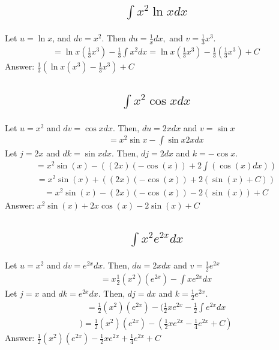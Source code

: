 \documentclass{article}
\begin{document}
\subsection{
	\begin{align*}
		\int{x^2 \ln{x}dx}
	\end{align*}
}

Let $u = \ln{x}$, and $dv = x^2$. Then $du = \frac{1}{x}dx,$ and  $ v = \frac{1}{3}x^3$.
\begin{align*}
	= \ln{x} (\frac{1}{3} x^3) - \frac{1}{3} \int{x^2 dx} = \ln{x} (\frac{1}{3} x^3) -\frac{1}{3}(\frac{1}{3} x^3) +C 
\end{align*}
Answer: $ \frac{1}{3} (\ln{x}( x^3) -\frac{1}{3} x^3) +C$


\subsection{
	\begin{align*}
		\int{x^2 \cos{x} dx}
	\end{align*}
}

Let $u = x^2$ and $dv = \cos{x} dx$. Then, $du = 2xdx$ and $v = \sin{x}$
\begin{align*}
	= x^2 \sin{x} - \int{\sin{x} 2x dx} 
\end{align*}
Let $j = 2x$ and $dk = \sin{x} dx$. Then, $dj = 2dx$ and $k = -\cos{x}$.
\begin{align*}
=x^2 \sin(x) - ((2x)(-\cos(x)) + 2 \int(\cos(x) dx))
\end{align*}
\begin{align*}
	 = x^2 \sin(x) + ((2x)(-\cos(x)) + 2(\sin(x) +C)) 
\end{align*}
\begin{align*}
	= x^2 \sin(x) - (2x)(-\cos(x))-2(\sin(x)) +C 
\end{align*}
Answer: $x^2 \sin(x) + 2x \cos(x) -2 \sin(x) +C$


\subsection{
	\begin{align*}
		\int{x^2 e^{2x}dx}
	\end{align*}
}

Let $u = x^2$ and $dv = e^{2x} dx$. Then, $du = 2xdx$ and $v = \frac{1}{2} e^{2x}$
\begin{align*}
	= x\frac{1}{2}(x^2)(e^{2x}) - \int{x e^{2x} dx} 
\end{align*}
Let $j = x$ and $dk = e^{2x} dx$. Then, $dj = dx$ and $k =\frac{1}{2} e^{2x} $.
\begin{align*}
= \frac{1}{2} (x^2)(e^{2x}) - (\frac{1}{2} x e^{2x} - \frac{1}{2} \int{e^{2x} dx} 
\end{align*}
\begin{align*}
	)= \frac{1}{2} (x^2)(e^{2x}) - (\frac{1}{2} x e^{2x} - \frac{1}{4} e^{2x} +C)
\end{align*}
Answer: $ \frac{1}{2} (x^2)(e^{2x}) - \frac{1}{2} x e^{2x} + \frac{1}{4} e^{2x} +C$
\end{document}
